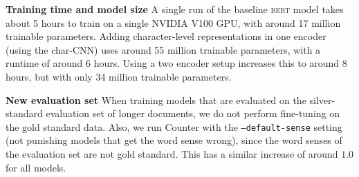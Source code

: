 \documentclass[11pt,a4paper]{article}
\newcommand{\bert}{\textsc{bert}}
\newcommand{\inlineheader}[1]{\vspace{0.06cm}
\noindent\textbf{#1}\quad
}
\begin{document}
\inlineheader{Training time and model size} A single run of the baseline \bert{} model takes about 5 hours to train on a single NVIDIA V100 GPU, with around 17 million trainable parameters. Adding character-level representations in one encoder (using the char-CNN) uses around 55 million trainable parameters, with a runtime of around 6 hours. Using a two encoder setup increases this to around 8 hours, but with only 34 million trainable parameters.

\inlineheader{New evaluation set} When training models that are evaluated on the silver-standard evaluation set of longer documents, we do not perform fine-tuning on the gold standard data. Also, we run Counter with the \texttt{--default-sense} setting (not punishing models that get the word sense wrong), since the word senses of the evaluation set are not gold standard. This has a similar increase of around $1.0$ for all models.
\end{document}
